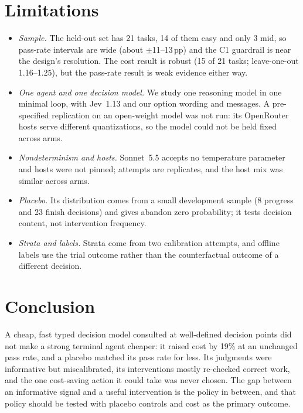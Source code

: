 \documentclass[10pt]{article}
\begin{document}
\section{Limitations}

\begin{itemize}
  \item \emph{Sample.} The held-out set has 21 tasks, 14 of them easy and only 3 mid, so pass-rate intervals are wide (about $\pm$11--13\,pp) and the C1 guardrail is near the design's resolution. The cost result is robust (15 of 21 tasks; leave-one-out 1.16--1.25), but the pass-rate result is weak evidence either way.
  \item \emph{One agent and one decision model.} We study one reasoning model in one minimal loop, with Jev~1.13 and our option wording and messages. A pre-specified replication on an open-weight model was not run: its OpenRouter hosts serve different quantizations, so the model could not be held fixed across arms.
  \item \emph{Nondeterminism and hosts.} Sonnet~5.5 accepts no temperature parameter and hosts were not pinned; attempts are replicates, and the host mix was similar across arms.
  \item \emph{Placebo.} Its distribution comes from a small development sample (8 progress and 23 finish decisions) and gives abandon zero probability; it tests decision content, not intervention frequency.
  \item \emph{Strata and labels.} Strata come from two calibration attempts, and offline labels use the trial outcome rather than the counterfactual outcome of a different decision.
\end{itemize}

\section{Conclusion}

A cheap, fast typed decision model consulted at well-defined decision points did not make a strong terminal agent cheaper: it raised cost by 19\% at an unchanged pass rate, and a placebo matched its pass rate for less.
Its judgments were informative but miscalibrated, its interventions mostly re-checked correct work, and the one cost-saving action it could take was never chosen.
The gap between an informative signal and a useful intervention is the policy in between, and that policy should be tested with placebo controls and cost as the primary outcome.
\end{document}
